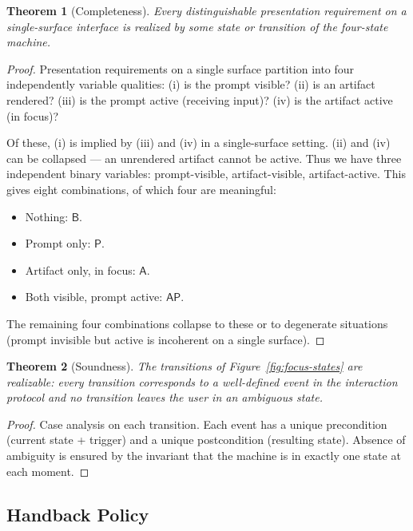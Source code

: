 \documentclass[11pt,twocolumn,a4paper]{article}
\newtheorem{theorem}{Theorem}[section]
\theoremstyle{definition}
\theoremstyle{remark}
\begin{document}
\begin{theorem}[Completeness]
\label{thm:focus-completeness}
Every distinguishable presentation requirement on a single-surface interface is realized by some state or transition of the four-state machine.
\end{theorem}

\begin{proof}
Presentation requirements on a single surface partition into four independently variable qualities: (i) is the prompt visible? (ii) is an artifact rendered? (iii) is the prompt active (receiving input)? (iv) is the artifact active (in focus)?

Of these, (i) is implied by (iii) and (iv) in a single-surface setting. (ii) and (iv) can be collapsed --- an unrendered artifact cannot be active. Thus we have three independent binary variables: prompt-visible, artifact-visible, artifact-active. This gives eight combinations, of which four are meaningful:
\begin{itemize}
    \item Nothing: $\mathsf{B}$.
    \item Prompt only: $\mathsf{P}$.
    \item Artifact only, in focus: $\mathsf{A}$.
    \item Both visible, prompt active: $\mathsf{AP}$.
\end{itemize}
The remaining four combinations collapse to these or to degenerate situations (prompt invisible but active is incoherent on a single surface).
\end{proof}

\begin{theorem}[Soundness]
\label{thm:focus-soundness}
The transitions of Figure~\ref{fig:focus-states} are realizable: every transition corresponds to a well-defined event in the interaction protocol and no transition leaves the user in an ambiguous state.
\end{theorem}

\begin{proof}
Case analysis on each transition. Each event has a unique precondition (current state + trigger) and a unique postcondition (resulting state). Absence of ambiguity is ensured by the invariant that the machine is in exactly one state at each moment.
\end{proof}

\subsection{Handback Policy}
\end{document}
